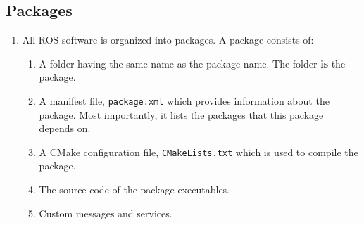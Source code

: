 \documentclass{article}
\begin{document}
        \subsection{Packages}
            \begin{enumerate}
                \item All ROS software is organized into packages. A package consists of:
                \begin{enumerate}
                    \item A folder having the same name as the package name. The folder \textbf{is} the package.
                    \item A manifest file, \texttt{package.xml} which provides information about the package. Most importantly, it lists the packages
                    that this package depends on.
                    \item A CMake configuration file, \texttt{CMakeLists.txt} which is used to compile the package.
                    \item The source code of the package executables.
                    \item Custom messages and services. 
                \end{enumerate}


\end{enumerate}
\end{document}
